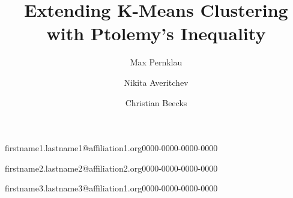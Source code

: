 \documentclass[english]{lni}
\begin{document}
\title[Ein Kurztitel]{Extending K-Means Clustering with Ptolemy’s Inequality}
 \author[1,2]{Max Pernklau}{firstname1.lastname1@affiliation1.org}{0000-0000-0000-0000}
 \author[2]{Nikita Averitchev}{firstname2.lastname2@affiliation2.org}{0000-0000-0000-0000}
 \author[3]{Christian Beecks}{firstname3.lastname3@affiliation1.org}{0000-0000-0000-0000}
\maketitle
\end{document}
